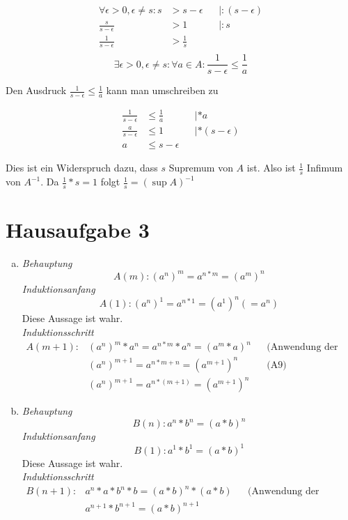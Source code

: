 \documentclass{article}
\begin{document}
\begin{align*}
  \forall \epsilon > 0, \epsilon \ne s \colon s &> s - \epsilon && | :(s - \epsilon) \\
  \frac{s}{s - \epsilon} &> 1 && | :s\\
  \frac{1}{s - \epsilon} &> \frac{1}{s} \\
\end{align*}
\[
  \exists \epsilon > 0, \epsilon \ne s \colon \forall a \in A \colon \frac{1}{s - \epsilon} \leq \frac{1}{a} 
\]

Den Ausdruck $\frac{1}{s - \epsilon} \leq \frac{1}{a}$ kann man umschreiben zu

\begin{align*}
  \frac{1}{s - \epsilon} &\leq \frac{1}{a} && | *a \\
  \frac{a}{s - \epsilon} &\leq 1           && | *(s - \epsilon)\\
  a &\leq s - \epsilon 
\end{align*}

Dies ist ein Widerspruch dazu, dass $s$ Supremum von $A$ ist. Also ist $\frac{1}{s}$ Infimum von $A^{-1}$.
Da $\frac{1}{s} * s = 1$ folgt $\frac{1}{s} = (\sup A)^{-1}$

\newpage
\section*{Hausaufgabe 3}


\begin{enumerate}[a)]
\item
  \emph{Behauptung}
  \[
    A(m) \colon (a^n)^m = a^{n * m} = (a^m)^n
  \]
  \emph{Induktionsanfang}
  \[
    A(1) \colon (a^n)^1 = a^{n * 1} = (a^1)^n (= a^n) 
  \]
  Diese Aussage ist wahr. \\
  \emph{Induktionsschritt}
  \begin{align*}
    A(m + 1) \colon &(a^n)^m * a^n = a^{n * m} * a^{n} = (a^m * a) ^ n  &&  \text{(Anwendung der Definition der Potenz)}\\
                    &(a^n)^{m + 1} = a^{n * m + n} = (a^{m + 1})^n      && \text{(A9)} \\
                    &(a^n)^{m + 1} = a^{n * (m + 1)} = (a^{m + 1})^n
  \end{align*}

\item
    \emph{Behauptung}
  \[
    B(n) \colon a^n * b^n = (a * b)^n
  \]
  \emph{Induktionsanfang}
  \[
    B(1) \colon a^1 * b^1 = (a * b)^1 
  \]
  Diese Aussage ist wahr. \\
  \emph{Induktionsschritt}
  \begin{align*}
    B(n + 1) \colon &a^n * a * b^n * b = (a * b)^n * (a * b) &&  \text{(Anwendung der Definition der Potenz)}\\
                    &a^{n + 1} * b^{n + 1} = (a * b)^{n + 1}
  \end{align*}
\end{enumerate}
\end{document}
